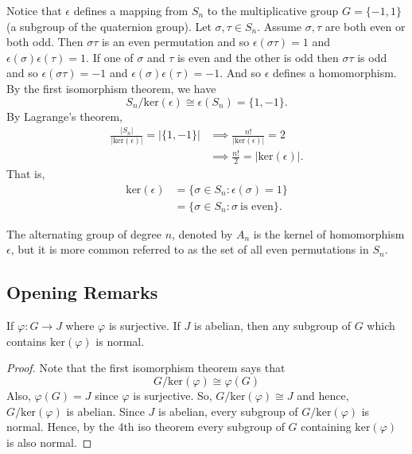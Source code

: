 Notice that \( \epsilon  \) defines a mapping from \( {S}_{n} \) to the multiplicative group \( G = \{  - 1, 1  \}  \) (a subgroup of the quaternion group). Let \( \sigma , \tau \in {S}_{n} \). Assume \( \sigma , \tau  \) are both even or both odd. Then  \( \sigma \tau  \) is an even permutation and so \( \epsilon (\sigma \tau) = 1  \) and \( \epsilon (\sigma) \epsilon (\tau) = 1  \). If one of \( \sigma  \) and \( \tau  \) is even and the other is odd then \( \sigma \tau  \) is odd and so \( \epsilon(\sigma \tau) = -1  \) and \( \epsilon (\sigma) \epsilon(\tau) = -1  \). And so \( \epsilon  \) defines a homomorphism. By the first isomorphism theorem, we have 
\[  {S}_{n} / \text{ker}(\epsilon) \cong \epsilon({S}_{n}) = \{ 1, -1  \}. \]
By Lagrange's theorem, 
\begin{align*}
    \frac{ | {S}_{n} |   }{  | \text{ker}(\epsilon) |  }  = | \{ 1 , -1  \}  | &\implies \frac{ n!  }{ | \text{ker}(\epsilon) |  }  = 2  \\
                                                                               &\implies \frac{ n!  }{  2  }  = |  \text{ker}(\epsilon) |.
\end{align*}
That is, 
\begin{align*}
    \text{ker}(\epsilon) &= \{  \sigma \in {S}_{n} : \epsilon(\sigma)  = 1 \}  \\
                         &= \{  \sigma \in {S}_{n} : \sigma \ \text{is even} \}. 
\end{align*}

\begin{definition}
    The alternating group of degree \( n \), denoted by \( {A}_{n} \) is the kernel of homomorphism \( \epsilon  \), but it is more common referred to as the set of all even permutations in \( {S}_{n} \).
\end{definition}


\subsection{Opening Remarks}

\begin{remark}
   If \( \varphi : G \to J  \) where \( \varphi  \) is surjective. If \( J  \) is abelian, then any subgroup of \( G  \) which contains \( \text{ker}(\varphi) \) is normal. 
\end{remark}
\begin{proof}
Note that the first isomorphism theorem says that 
   \[  G / \text{ker}(\varphi)  \cong \varphi(G) \]
   Also, \( \varphi(G) = J  \) since \( \varphi  \) is surjective. So, \( G / \text{ker}(\varphi) \cong J  \) and hence, \( G / \text{ker}(\varphi) \) is abelian. Since \( J  \) is abelian, every subgroup of \( G / \text{ker}(\varphi) \) is normal. Hence, by the 4th iso theorem every subgroup of \( G  \) containing \( \text{ker}(\varphi) \) is also normal.
\end{proof}



